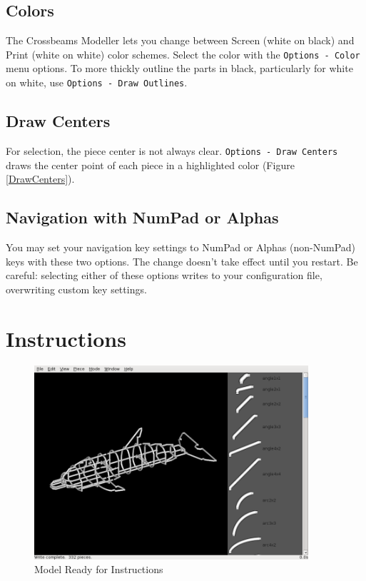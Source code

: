 \documentclass[12pt]{report}
\begin{document}
\subsection{Colors}

The Crossbeams Modeller lets you change between Screen (white on
black) and Print (white on white) color schemes.  Select the color
with the {\tt Options - Color} menu options.  To more thickly outline
the parts in black, particularly for white on white, use {\tt Options -
  Draw Outlines}.

\subsection{Draw Centers}

For selection, the piece center is not always clear.  {\tt Options -
  Draw Centers} draws the center point of each piece in a highlighted
color (Figure \ref{DrawCenters}).

\subsection{Navigation with NumPad or Alphas}

You may set your navigation key settings to NumPad or Alphas
(non-NumPad) keys with these two options.  The change doesn't take
effect until you restart.  Be careful: selecting either of these
options writes to your configuration file, overwriting custom key
settings.

\section{Instructions}

\begin{figure}[h]
\begin{center}
\includegraphics[width=4.0in]{doc_images/manual_instructions_model.png}
\caption{Model Ready for Instructions}
\label{InstructionsModel}
\end{center}
\end{figure}
\end{document}
